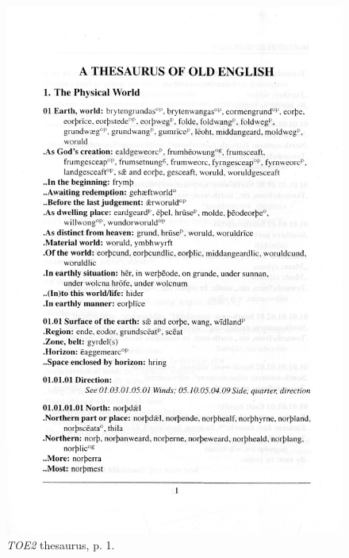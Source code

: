 \begin{figure}[htbp]
  \centering
    \includegraphics[width=\linewidth]{Stolk_thes-content/fig/thes/TOE2-p001.jpg}
  \caption{\textit{TOE2} thesaurus, p. 1.}
  \label{fig:1.A:TOE2:thesaurus}
\end{figure}

